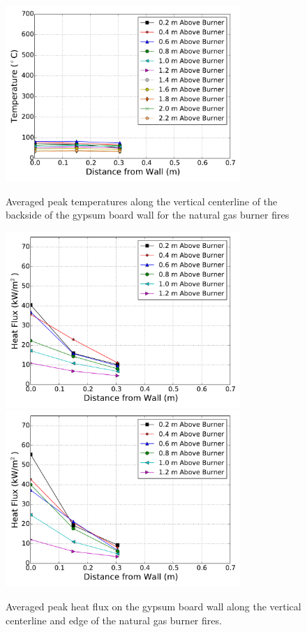 \documentclass[twoside]{uocthesis}
\begin{document}
\begin{figure}[p]
	\centering
	\includegraphics[width=3.5in]{../Figures/IWGB_NG_TC_Back_Center_Avg}\\
	\caption[Averaged peak temperatures on the backside of the gypsum board wall for the natural gas burner fires.]{Averaged peak temperatures along the vertical centerline of the backside of the gypsum board wall for the natural gas burner fires}
	\label{IWGB_NG_Temp_RearCenter}
\end{figure}

\begin{figure}
	\centering
	\includegraphics[width=3.5in]{../Figures/IWGB_NG_HF_Center_Avg}\\
	\includegraphics[width=3.5in]{../Figures/IWGB_NG_HF_Offset_Avg}\\
	\caption[Averaged peak heat flux on the gypsum board wall for the natural gas burner fires.]{Averaged peak heat flux on the gypsum board wall along the vertical centerline and edge of the natural gas burner fires. }
	\label{IWGB_NG_HF_RearCenter}
\end{figure}
\end{document}
